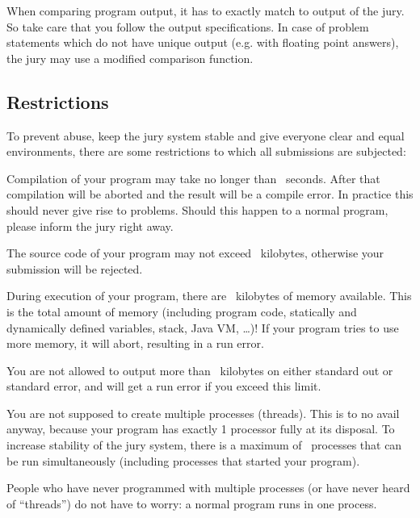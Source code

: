 When comparing program output, it has to exactly match to output of
the jury. So take care that you follow the output specifications. In
case of problem statements which do not have unique output (e.g. with
floating point answers), the jury may use a modified comparison
function.

\subsection{Restrictions}\label{runlimits}

To prevent abuse, keep the jury system stable and give everyone
clear and equal environments, there are some restrictions to which all
submissions are subjected:

\begin{description}
\item[compile time]
Compilation of your program may take no longer than \COMPILETIME\
seconds. After that compilation will be aborted and the result will
be a compile error. In practice this should never give rise to
problems. Should this happen to a normal program, please inform the
jury right away.

\item[source size]
The source code of your program may not exceed \SOURCESIZE\ kilobytes,
otherwise your submission will be rejected.

\item[memory]
During execution of your program, there are \MEMLIMIT\ kilobytes of
memory available. This is the total amount of memory (including
program code, statically and dynamically defined variables, stack,
Java VM, \dots)! If your program tries to use more memory, it will
abort, resulting in a run error.

\item[program output]
You are not allowed to output more than \FILELIMIT\ kilobytes 
on either standard out or standard error, and will get a run error
if you exceed this limit.

\item[number of processes]
You are not supposed to create multiple processes (threads). This is
to no avail anyway, because your program has exactly 1 processor fully
at its disposal. To increase stability of the jury system, there is a
maximum of \PROCLIMIT\ processes that can be run simultaneously
(including processes that started your program).

People who have never programmed with multiple processes (or have
never heard of ``threads'') do not have to worry: a normal program
runs in one process.

\end{description}

